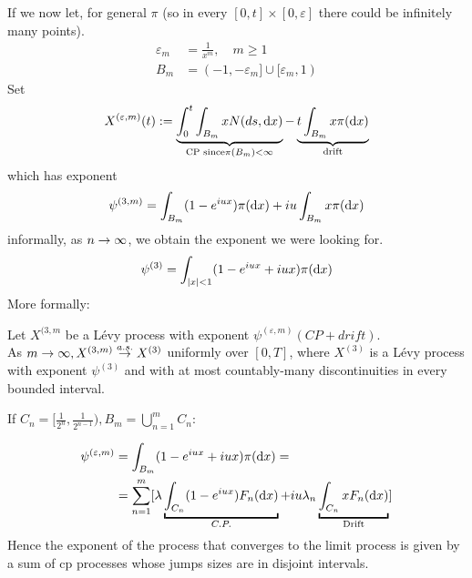 \documentclass{article}
\begin{document}
	If we now let, for general $\pi$ (so in every $[0,t] \times [0,\varepsilon]$ there could be infinitely many points).
	\begin{align*}
		\varepsilon_m &= \frac{1}{x^m}, \quad m \geq 1\\
		B_m &= (-1, - \varepsilon_m] \cup [\varepsilon_m, 1)
	\end{align*}
	Set 
	\begin{equation*}
		X^{(\varepsilon,m)}(t) := \underbrace{\int_0^t\int_{B_m} x N(ds,\mathop{}\!\mathrm{d} x)}_{\text{CP since} \pi(B_m)<\infty} - \underbrace{t \int_{B_m}x\pi(\mathop{}\!\mathrm{d} x)}_{\text{drift}}
	\end{equation*}
	which has exponent 
	\begin{equation*}
		\psi^{(3,m)} = \int_{B_m}(1-e^{iux}) \pi(\mathop{}\!\mathrm{d} x) + iu \int_{B_m} x \pi(\mathop{}\!\mathrm{d} x)
	\end{equation*}
	informally, as $n \rightarrow \infty$, we obtain the exponent we were looking for. \\
	\begin{equation*}
		\psi^{(3)}= \int_{|x|<1}(1-e^{iux} + iux)\pi(\mathop{}\!\mathrm{d} x)
	\end{equation*}
	More formally:
	\begin{proposition}
		Let $X^{(3,m}$ be a L\'evy process with exponent $\psi^{(\varepsilon,m)}(CP + drift)$.\\
		As $m \rightarrow \infty, X^{(3,m)} \stackrel{a.s.} {\rightarrow} X^{(3)}$ uniformly over $[0,T]$, where $X^{(3)}$ is a L\'evy process with exponent $\psi^{(3)}$ and with at most countably-many discontinuities in every bounded interval.
	\end{proposition}
	If $C_n = [\frac{1}{2^n},\frac{1}{2^{n-1}}), B_m = \bigcup_{n = 1} ^ m C_n$:\\
	\begin{figure}[H]
		\centering
		
	\end{figure}
	\begin{align*}
		\psi^{(\varepsilon,m)} &=\int_{B_m}(1-e^{iux}+iux)\pi(\dif x)=\\
		&=\sum_{n=1}^m[\lambda\underbracket{\int_{C_n}(1-e^{iux})F_n(\dif x)}_{C.P.}+ iu \lambda_n\underbracket{\int_{C_n}x F_n(\dif x)}_{\text{Drift}}]
	\end{align*}
	Hence the exponent of the process that converges to the limit process is given by a sum of cp processes whose jumps sizes are in disjoint intervals.
\end{document}
